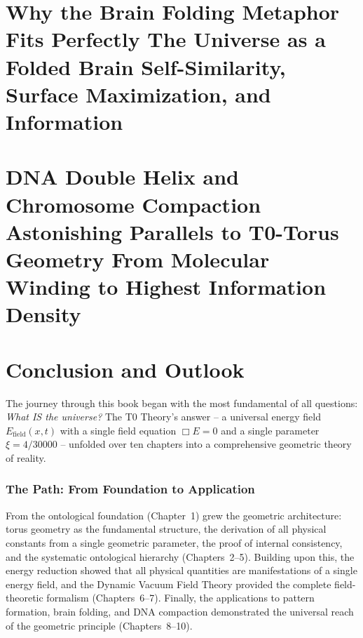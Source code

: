 \documentclass[11pt,openright,twoside]{book}
\begin{document}
\chapter{Why the Brain Folding Metaphor Fits Perfectly The Universe as a Folded Brain Self-Similarity, Surface Maximization, and Information}


\chapter{DNA Double Helix and Chromosome Compaction Astonishing Parallels to T0-Torus Geometry From Molecular Winding to Highest Information Density}


\backmatter

\chapter*{Conclusion and Outlook}

The journey through this book began with the most fundamental of all questions: \textit{What IS the universe?} The T0 Theory's answer -- a universal energy field $E_{\text{field}}(x,t)$ with a single field equation $\Box E = 0$ and a single parameter $\xi = 4/30000$ -- unfolded over ten chapters into a comprehensive geometric theory of reality.

\subsection*{The Path: From Foundation to Application}

From the ontological foundation (Chapter~1) grew the geometric architecture: torus geometry as the fundamental structure, the derivation of all physical constants from a single geometric parameter, the proof of internal consistency, and the systematic ontological hierarchy (Chapters~2--5). Building upon this, the energy reduction showed that all physical quantities are manifestations of a single energy field, and the Dynamic Vacuum Field Theory provided the complete field-theoretic formalism (Chapters~6--7). Finally, the applications to pattern formation, brain folding, and DNA compaction demonstrated the universal reach of the geometric principle (Chapters~8--10).
\end{document}
